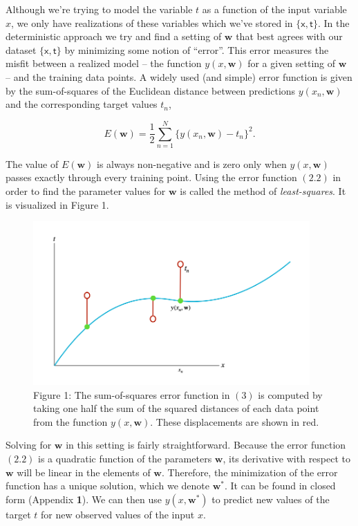 \documentclass[
  0.875em,
  letterpaper,
  DIV=11,
  numbers=noendperiod]{scrartcl}
\begin{document}
Although we're trying to model the variable \(t\) as a function of the
input variable \(x\), we only have realizations of these variables which
we've stored in \(\{\pmb{\mathsf{x}}, \pmb{\mathsf{t}}\}\). In the
deterministic approach we try and find a setting of \(\mathbf{w}\) that
best agrees with our dataset \(\{\pmb{\mathsf{x}}, \pmb{\mathsf{t}}\}\)
by minimizing some notion of ``error''. This error measures the misfit
between a realized model -- the function \(y(x, \mathbf{w})\) for a
given setting of \(\mathbf{w}\) -- and the training data points. A
widely used (and simple) error function is given by the sum-of-squares
of the Euclidean distance between predictions \(y(x_n, \mathbf{w})\) and
the corresponding target values \(t_n\),

\[
E(\mathbf{w}) = \frac{1}{2} \sum_{n=1}^N \{y(x_n, \mathbf{w}) - t_n \}^2. \tag{2.2}
\]

The value of \(E(\mathbf{w})\) is always non-negative and is zero only
when \(y(x, \mathbf{w})\) passes exactly through every training point.
Using the error function \((2.2)\) in order to find the parameter values
for \(\mathbf{w}\) is called the method of \emph{least-squares}. It is
visualized in Figure 1.

\begin{figure}

{\centering \includegraphics[width=4.16667in,height=\textheight]{./img/sum_of_squares.png}

}

\caption{Figure 1: The sum-of-squares error function in \((3)\) is
computed by taking one half the sum of the squared distances of each
data point from the function \(y(x, \mathbf{w})\). These displacements
are shown in red.}

\end{figure}

Solving for \(\mathbf{w}\) in this setting is fairly straightforward.
Because the error function \((2.2)\) is a quadratic function of the
parameters \(\mathbf{w}\), its derivative with respect to \(\mathbf{w}\)
will be linear in the elements of \(\mathbf{w}\). Therefore, the
minimization of the error function has a unique solution, which we
denote \(\mathbf{w}^*\). It can be found in closed form (Appendix
\textbf{1}). We can then use \(y(x, \mathbf{w}^{*})\) to predict new
values of the target \(t\) for new observed values of the input \(x\).
\end{document}
